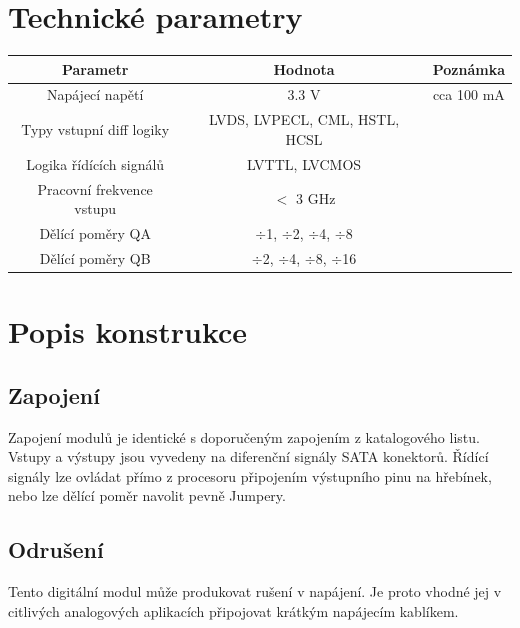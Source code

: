 \documentclass[12pt,a4paper,oneside]{article}
\begin{document}
\section{Technické parametry}
\begin{table}[htbp]
\begin{center}
\begin{tabular}{|c|c|c|}
\hline
\multicolumn{1}{|c|}{Parametr} & \multicolumn{1}{|c|}{Hodnota} & \multicolumn{1}{|c|}{Poznámka} \\ \hline
Napájecí napětí & 3.3 V &  cca 100 mA \\ \hline
Typy vstupní diff logiky  & LVDS, LVPECL, CML, HSTL, HCSL & \\ \hline
Logika řídících signálů  & LVTTL, LVCMOS & \\ \hline
Pracovní frekvence vstupu  & $<$ 3 GHz & \\ \hline
Dělící poměry QA & $\div$1, $\div$2, $\div$4, $\div$8 & \\ \hline
Dělící poměry QB & $\div$2, $\div$4, $\div$8, $\div$16 & \\ \hline
\end{tabular}
\end{center}
\end{table}

\newpage
\section{Popis konstrukce}

\subsection{Zapojení}

Zapojení modulů je identické s doporučeným zapojením z katalogového listu. Vstupy a výstupy jsou vyvedeny na diferenční signály SATA konektorů. Řídící signály lze ovládat přímo z procesoru připojením výstupního pinu na hřebínek, nebo lze dělící poměr navolit pevně Jumpery. 



\subsection{Odrušení}

Tento digitální modul může produkovat rušení v napájení. Je proto vhodné jej v citlivých analogových aplikacích připojovat krátkým napájecím kablíkem.
\end{document}
